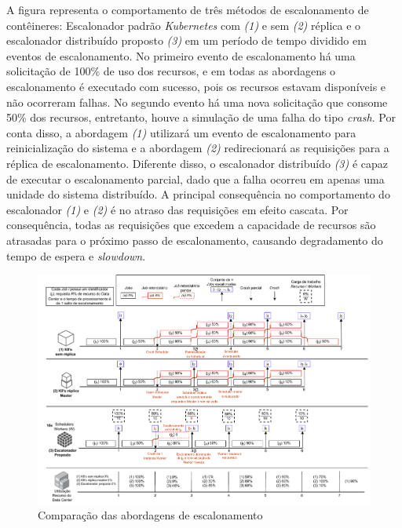 A figura representa o comportamento de três métodos de escalonamento de contêineres: Escalonador padrão \textit{Kubernetes} com \textit{(1)} e sem \textit{(2)} réplica e o escalonador distribuído proposto \textit{(3)} em um período de tempo dividido em eventos de escalonamento. No primeiro evento de escalonamento há uma solicitação de 100\% de uso dos recursos, e em todas as abordagens o escalonamento é executado com sucesso, pois os recursos estavam disponíveis e não ocorreram falhas. No segundo evento há uma nova solicitação que consome 50\% dos recursos, entretanto, houve a simulação de uma falha do tipo \textit{crash}. Por conta disso, a abordagem \textit{(1)} utilizará um evento de escalonamento para reinicialização do sistema e a abordagem \textit{(2)} redirecionará as requisições para a réplica de escalonamento. Diferente disso, o escalonador distribuído \textit{(3)} é capaz de executar o escalonamento parcial, dado que a falha ocorreu em apenas uma unidade do sistema distribuído. A principal consequência no comportamento do escalonador \textit{(1)} e \textit{(2)} é no atraso das requisições em efeito cascata. Por consequência, todas as requisições que excedem a capacidade de recursos são atrasadas para o próximo passo de escalonamento, causando degradamento do tempo de espera e \textit{slowdown}.

\begin{figure}[h!]
	\caption{\label{fig:comp_sched}Comparação das abordagens de escalonamento}
	\centering
	\includegraphics[width=1\linewidth]{assets/schedule-proposal.drawio.pdf}
\end{figure}



